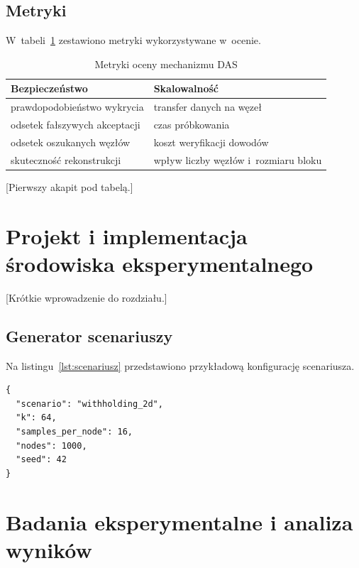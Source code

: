 \documentclass[a4paper,12pt,twoside,openany]{report}
\begin{document}
\section{Metryki}

W~tabeli~\ref{tab:metryki} zestawiono metryki wykorzystywane w~ocenie.

\begin{table}[htbp]
  \caption{Metryki oceny mechanizmu DAS}
  \label{tab:metryki}
  \begin{tabularx}{\linewidth}{|X|X|}
    \hline
    Bezpieczeństwo                & Skalowalność                         \\ \hline
    prawdopodobieństwo wykrycia   & transfer danych na węzeł             \\ \hline
    odsetek fałszywych akceptacji & czas próbkowania                     \\ \hline
    odsetek oszukanych węzłów     & koszt weryfikacji dowodów            \\ \hline
    skuteczność rekonstrukcji     & wpływ liczby węzłów i~rozmiaru bloku \\ \hline
  \end{tabularx}
\end{table}

[Pierwszy akapit pod tabelą.]

\chapter{Projekt i implementacja środowiska eksperymentalnego}
\label{chap:implementacja}

[Krótkie wprowadzenie do rozdziału.]

\section{Generator scenariuszy}

Na listingu~\ref{lst:scenariusz} przedstawiono przykładową konfigurację
scenariusza.

\begin{lstlisting}[caption={Przykładowa konfiguracja scenariusza}, label={lst:scenariusz}]
{
  "scenario": "withholding_2d",
  "k": 64,
  "samples_per_node": 16,
  "nodes": 1000,
  "seed": 42
}
\end{lstlisting}

\chapter{Badania eksperymentalne i analiza wyników}
\label{chap:badania}
\end{document}
